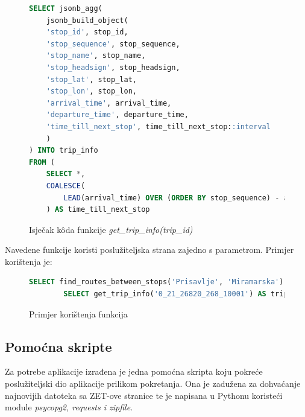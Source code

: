 \documentclass[zavrsnirad]{fer}
\begin{document}
\begin{figure}[h]
	\centering
	\begin{minipage}{0.8\linewidth}
		\begin{lstlisting}[language=SQL]
SELECT jsonb_agg(
	jsonb_build_object(
	'stop_id', stop_id,
	'stop_sequence', stop_sequence,
	'stop_name', stop_name,
	'stop_headsign', stop_headsign,
	'stop_lat', stop_lat,
	'stop_lon', stop_lon,
	'arrival_time', arrival_time,
	'departure_time', departure_time,
	'time_till_next_stop', time_till_next_stop::interval
	)
) INTO trip_info
FROM (
	SELECT *,
	COALESCE(
		LEAD(arrival_time) OVER (ORDER BY stop_sequence) - arrival_time, INTERVAL '0 seconds'
	) AS time_till_next_stop

		\end{lstlisting}
	\end{minipage}
	\caption{Isječak k\^oda funkcije \textit{get\_trip\_info(trip\_id)}}
	\label{slk:sqlfunkcija}
\end{figure}

Navedene funkcije koristi poslužiteljska strana zajedno s parametrom. Primjer korištenja je:
\begin{figure}[h]
	\centering
	\begin{minipage}{0.9\linewidth}
		\begin{lstlisting}[language=SQL]
		SELECT find_routes_between_stops('Prisavlje', 'Miramarska') AS routes
		SELECT get_trip_info('0_21_26820_268_10001') AS trip_info
		\end{lstlisting}
	\end{minipage}
	\caption{Primjer korištenja funkcija}
	\label{slk:sqlprimjer}
\end{figure}


\subsection{Pomoćna skripte}
\label{sec:skripta}
Za potrebe aplikacije izrađena je jedna pomoćna skripta koju pokreće poslužiteljski dio aplikacije prilikom pokretanja. Ona je zadužena za dohvaćanje najnovijih datoteka sa ZET-ove stranice te je napisana u Pythonu koristeći module \textit{psycopg2, requests i zipfile}.
\end{document}
